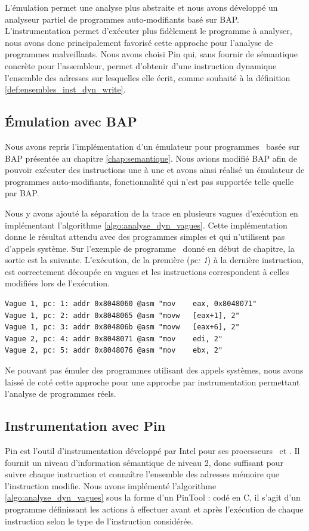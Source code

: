 L'émulation permet une analyse plus abstraite et nous avons développé un analyseur partiel de programmes auto-modifiants basé sur BAP.
L'instrumentation permet d'exécuter plus fidèlement le programme à analyser, nous avons donc principalement favorisé cette approche pour l'analyse de programmes malveillants. Nous avons choisi Pin qui, sans fournir de sémantique concrète pour l'assembleur, permet d'obtenir d'une instruction dynamique l'ensemble des adresses sur lesquelles elle écrit, comme souhaité à la définition \ref{def:ensembles_inst_dyn_write}.

\subsection{Émulation avec BAP}
Nous avons repris l'implémentation d'un émulateur pour programmes \sms\ basée sur BAP présentée au chapitre \ref{chap:semantique}. Nous avions modifié BAP afin de pouvoir exécuter des instructions une à une et avons ainsi réalisé un émulateur de programmes auto-modifiants, fonctionnalité qui n'est pas supportée telle quelle par BAP.

Nous y avons ajouté la séparation de la trace en plusieurs vagues d'exécution en implémentant l'algorithme \ref{algo:analyse_dyn_vagues}.
Cette implémentation donne le résultat attendu avec des programmes simples et qui n'utilisent pas d'appels système.
Sur l'exemple de programme \sm\ donné en début de chapitre, la sortie est la suivante.
L'exécution, de la première (\emph{pc: 1}) à la dernière instruction, est correctement découpée en vagues et les instructions correspondent à celles modifiées lors de l'exécution.

\begin{center}
\begin{verbatim}
Vague 1, pc: 1: addr 0x8048060 @asm "mov    eax, 0x8048071"
Vague 1, pc: 2: addr 0x8048065 @asm "movw   [eax+1], 2"
Vague 1, pc: 3: addr 0x804806b @asm "movw   [eax+6], 2"
Vague 2, pc: 4: addr 0x8048071 @asm "mov    edi, 2"
Vague 2, pc: 5: addr 0x8048076 @asm "mov    ebx, 2"
\end{verbatim}
\end{center}

Ne pouvant pas émuler des programmes utilisant des appels systèmes, nous avons laissé de coté cette approche pour une approche par instrumentation permettant l'analyse de programmes réels.


\subsection{Instrumentation avec Pin}
Pin est l'outil d'instrumentation développé par Intel pour ses processeurs \xq\ et \xs.
Il fournit un niveau d'information sémantique de niveau 2, donc suffisant pour suivre chaque instruction et connaître l'ensemble des adresses mémoire que l'instruction modifie.
Nous avons implémenté l'algorithme \ref{algo:analyse_dyn_vagues} sous la forme d'un PinTool : codé en C, il s'agit d'un programme définissant les actions à effectuer avant et après l'exécution de chaque instruction selon le type de l'instruction considérée.

